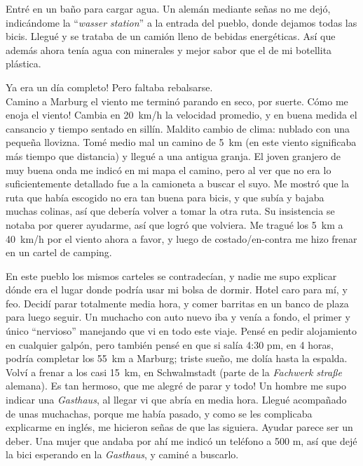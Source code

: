 Entr\'e en un ba\~no para cargar agua. Un alem\'an mediante se\~nas no me
dej\'o, indic\'andome la ``\emph{wasser station}'' a la entrada del pueblo,
donde dejamos todas las bicis. Llegu\'e y se trataba de un cami\'on lleno de
bebidas energ\'eticas. As\'i que adem\'as ahora ten\'ia agua con minerales y
mejor sabor que el de mi botellita pl\'astica.

\textexclamdown Ya era un d\'ia completo! Pero faltaba rebalsarse.\\

Camino a Marburg el viento me termin\'o parando en seco, por suerte.
\textexclamdown C\'omo me enoja el viento! Cambia en 20~km/h la velocidad
promedio, y en buena medida el cansancio y tiempo sentado en sill\'in. Maldito
cambio de clima: nublado con una peque\~na llovizna. Tom\'e medio mal un
camino de 5~km (en este viento significaba m\'as tiempo que distancia) y
llegu\'e a una antigua granja. El joven granjero de muy buena onda me indic\'o
en mi mapa el camino, pero al ver que no era lo suficientemente detallado fue
a la camioneta a buscar el suyo. Me mostr\'o que la ruta que hab\'ia
escogido no era tan buena para bicis, y que sub\'ia y bajaba muchas colinas,
as\'i que deber\'ia volver a tomar la otra ruta. Su insistencia se notaba por
querer ayudarme, as\'i que logr\'o que volviera. Me tragu\'e los 5~km a
40~km/h por el viento ahora a favor, y luego de costado/en-contra me hizo
frenar en un cartel de camping.

En este pueblo los mismos carteles se contradec\'ian, y nadie me supo explicar
d\'onde era el lugar donde podr\'ia usar mi bolsa de dormir. Hotel caro para
m\'i, y feo. Decid\'i parar totalmente media hora, y comer barritas en un
banco de plaza para luego seguir. Un muchacho con auto nuevo iba y ven\'ia a
fondo, el primer y \'unico ``nervioso'' manejando que vi en todo este viaje.
Pens\'e en pedir alojamiento en cualquier galp\'on, pero tambi\'en pens\'e en
que si sal\'ia 4:30 pm, en 4 horas, podr\'ia completar los 55~km a
Marburg; triste sue\~no, me dol\'ia hasta la espalda.\\

Volv\'i a frenar a los casi 15~km, en Schwalmstadt (parte de la \emph{Fachwerk
stra\ss e} alemana). \textexclamdown Es tan hermoso, que me alegr\'e de parar
y todo! Un hombre me supo indicar una \emph{Gasthaus}, al llegar vi que
abr\'ia en media hora. Llegu\'e acompa\~nado de unas muchachas, porque me
hab\'ia pasado, y como se les complicaba explicarme en ingl\'es, me hicieron
se\~nas de que las siguiera. Ayudar parece ser un deber. Una mujer que andaba
por ah\'i me indic\'o un tel\'efono a 500 m, as\'i que dej\'e la bici
esperando en la \emph{Gasthaus}, y camin\'e a buscarlo.

